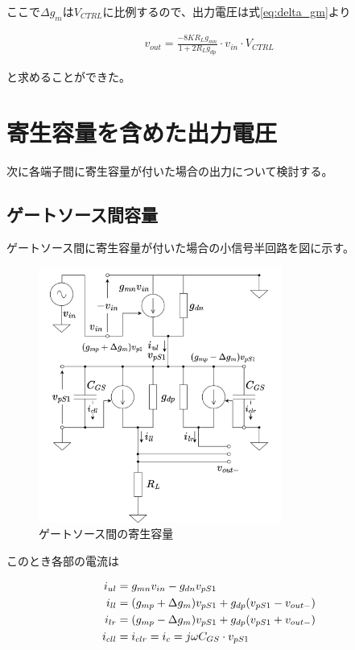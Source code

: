 \documentclass[twocolumn]{jsarticle}
\begin{document}
ここで$\Delta g_{m}$は$V_{CTRL}$に比例するので、出力電圧は式\eqref{eq:delta_gm}より

\begin{align}
    v_{out}=\frac{-8KR_{L}g_{mn}}{1+2R_{L}g_{dp}}\cdot v_{in}\cdot V_{CTRL} \label{eq:vout}
\end{align}

と求めることができた。

\section{寄生容量を含めた出力電圧}
次に各端子間に寄生容量が付いた場合の出力について検討する。

    \subsection{ゲートソース間容量}
    ゲートソース間に寄生容量が付いた場合の小信号半回路を図に示す。

    \begin{figure}[b]
        \begin{center}
            \includegraphics*[width=80mm]{figures/FoldedGilbert_GS_Half_Equivalent.png}
            \caption{ゲートソース間の寄生容量}
            \label{fig:cgs}
        \end{center}
    \end{figure}

    このとき各部の電流は

    \begin{align}
        i_{ul} &= g_{mn}v_{in}-g_{dn}v_{pS1}    \notag\\
        i_{ll} &= (g_{mp}+\Delta g_{m})v_{pS1}+g_{dp}(v_{pS1}-v_{out-})     \notag\\
        i_{lr} &= (g_{mp}-\Delta g_{m})v_{pS1}+g_{dp}(v_{pS1}+v_{out-})     \notag\\
        i_{cll} &= i_{clr} = i_{c} = j\omega C_{GS}\cdot v_{pS1}     \notag
    \end{align}
\end{document}
